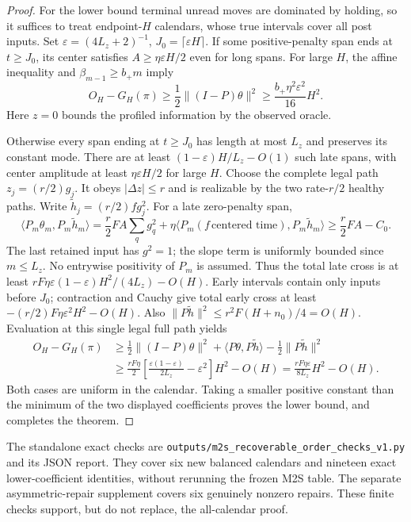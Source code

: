 \documentclass[11pt]{article}
\newcommand{\ip}[2]{\langle #1,#2\rangle}
\begin{document}
\begin{proof}
For the lower bound terminal unread moves are dominated by holding,
so it suffices to treat endpoint-$H$ calendars, whose true intervals
cover all post inputs. Set
$\varepsilon=(4L_z+2)^{-1}$, $J_0=\lceil\varepsilon H\rceil$.
If some positive-penalty span ends at $t\ge J_0$, its center satisfies
$A\ge\eta\varepsilon H/2$ even for long spans.
For large $H$, the affine inequality and $\beta_{m-1}\ge b_+m$ imply
\[
O_H-G_H(\pi)\ge\frac12\|(I-P)\theta\|^2
\ge \frac{b_+\eta^2\varepsilon^2}{16}H^2 .
\]
Here $z=0$ bounds the profiled information by the observed oracle.

Otherwise every span ending at $t\ge J_0$ has length at most $L_z$
and preserves its constant mode. There are at least
$(1-\varepsilon)H/L_z-O(1)$ such late spans, with center amplitude
at least $\eta\varepsilon H/2$ for large $H$.
Choose the complete legal path $z_j=(r/2)g_j$.
It obeys $|\Delta z|\le r$ and is realizable by the two rate-$r/2$
healthy paths. Write
$\widetilde h_j=(r/2)fg_j^2$.
For a late zero-penalty span,
\[
\ip{P_m\theta_m}{P_m\widetilde h_m}
=\frac r2 FA\sum_qg_q^2+
\eta\ip{P_m(f\,\text{centered time})}{P_m\widetilde h_m}
\ge \frac r2 FA-C_0 .
\]
The last retained input has $g^2=1$; the slope term is uniformly
bounded since $m\le L_z$. No entrywise positivity of $P_m$ is assumed.
Thus the total late cross is at least
$rF\eta\varepsilon(1-\varepsilon)H^2/(4L_z)-O(H)$.
Early intervals contain only inputs before $J_0$; contraction and
Cauchy give total early cross at least
$-(r/2)F\eta\varepsilon^2H^2-O(H)$.
Also $\|P\widetilde h\|^2\le r^2F(H+n_0)/4=O(H)$.
Evaluation at this single legal full path yields
\[
\begin{split}
O_H-G_H(\pi)&\ge
\frac12\|(I-P)\theta\|^2+
\ip{P\theta}{P\widetilde h}-\frac12\|P\widetilde h\|^2\\
&\ge \frac{rF\eta}{2}
 \left[\frac{\varepsilon(1-\varepsilon)}{2L_z}
       -\varepsilon^2\right]H^2-O(H)
=\frac{rF\eta\varepsilon}{8L_z}H^2-O(H).
\end{split}
\]
Both cases are uniform in the calendar. Taking a smaller positive
constant than the minimum of the two displayed coefficients proves
the lower bound, and completes the theorem.
\end{proof}

The standalone exact checks are
\texttt{outputs/m2s\_recoverable\_order\_checks\_v1.py}
and its JSON report. They cover six new balanced calendars and
nineteen exact lower-coefficient identities, without rerunning the
frozen M2S table. The separate asymmetric-repair supplement covers
six genuinely nonzero repairs. These finite checks support, but do
not replace, the all-calendar proof.
\end{document}
